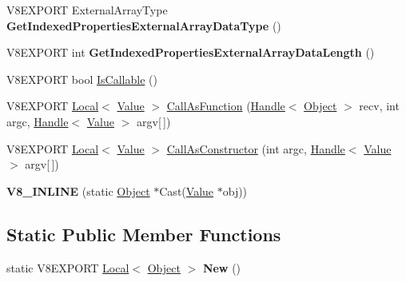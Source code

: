 \begin{DoxyCompactItemize}
\item 
\hypertarget{classv8_1_1_object_a235b6394b7651077dc2a7642bc97c4a9}{}V8\+E\+X\+P\+O\+R\+T External\+Array\+Type {\bfseries Get\+Indexed\+Properties\+External\+Array\+Data\+Type} ()\label{classv8_1_1_object_a235b6394b7651077dc2a7642bc97c4a9}

\item 
\hypertarget{classv8_1_1_object_aa0b083e6d5ec0a17d300759de482a1d2}{}V8\+E\+X\+P\+O\+R\+T int {\bfseries Get\+Indexed\+Properties\+External\+Array\+Data\+Length} ()\label{classv8_1_1_object_aa0b083e6d5ec0a17d300759de482a1d2}

\item 
V8\+E\+X\+P\+O\+R\+T bool \hyperlink{classv8_1_1_object_a73e7f8c470da4fa3ccc2ce8d58671bed}{Is\+Callable} ()
\item 
V8\+E\+X\+P\+O\+R\+T \hyperlink{classv8_1_1_local}{Local}$<$ \hyperlink{classv8_1_1_value}{Value} $>$ \hyperlink{classv8_1_1_object_ab6b6c44668d7a0d0b5b1056f8de4fd6b}{Call\+As\+Function} (\hyperlink{classv8_1_1_handle}{Handle}$<$ \hyperlink{classv8_1_1_object}{Object} $>$ recv, int argc, \hyperlink{classv8_1_1_handle}{Handle}$<$ \hyperlink{classv8_1_1_value}{Value} $>$ argv\mbox{[}$\,$\mbox{]})
\item 
V8\+E\+X\+P\+O\+R\+T \hyperlink{classv8_1_1_local}{Local}$<$ \hyperlink{classv8_1_1_value}{Value} $>$ \hyperlink{classv8_1_1_object_a156c6b33082be397626ce106369e4eba}{Call\+As\+Constructor} (int argc, \hyperlink{classv8_1_1_handle}{Handle}$<$ \hyperlink{classv8_1_1_value}{Value} $>$ argv\mbox{[}$\,$\mbox{]})
\item 
\hypertarget{classv8_1_1_object_aef3c37836376e1069d8c1b91caa5c20d}{}{\bfseries V8\+\_\+\+I\+N\+L\+I\+N\+E} (static \hyperlink{classv8_1_1_object}{Object} $\ast$Cast(\hyperlink{classv8_1_1_value}{Value} $\ast$obj))\label{classv8_1_1_object_aef3c37836376e1069d8c1b91caa5c20d}

\end{DoxyCompactItemize}
\subsection*{Static Public Member Functions}
\begin{DoxyCompactItemize}
\item 
\hypertarget{classv8_1_1_object_a45c986af65c199e7f453719d03de7650}{}static V8\+E\+X\+P\+O\+R\+T \hyperlink{classv8_1_1_local}{Local}$<$ \hyperlink{classv8_1_1_object}{Object} $>$ {\bfseries New} ()\label{classv8_1_1_object_a45c986af65c199e7f453719d03de7650}

\end{DoxyCompactItemize}



